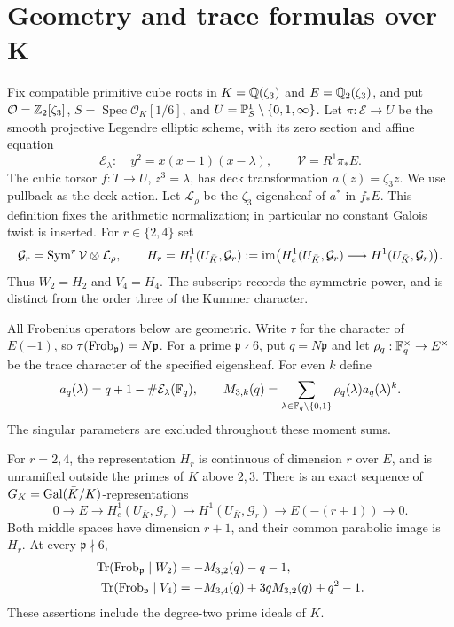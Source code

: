 \section{Geometry and trace formulas over K}\label{sec:geometry}

Fix compatible primitive cube roots in
\(K=\mathbb Q(\zeta_3)\) and \(E=\mathbb Q_2(\zeta_3)\), and put
\(\mathcal O=\mathbb Z_2[\zeta_3]\),
\(S=\operatorname{Spec}\mathcal O_K[1/6]\), and
\(U=\mathbb P^1_S\setminus\{0,1,\infty\}\).
Let \(\pi:\mathcal E\to U\) be the smooth projective Legendre elliptic
scheme, with its zero section and affine equation
\[
 \mathcal E_\lambda:\quad y^2=x(x-1)(x-\lambda),
 \qquad \mathcal V=R^1\pi_*E.
\]
The cubic torsor \(f:T\to U\), \(z^3=\lambda\), has deck
transformation \(a(z)=\zeta_3z\). We use pullback as the deck action.
Let \(\mathcal L_\rho\) be the \(\zeta_3\)-eigensheaf of \(a^*\)
in \(f_*E\). This definition fixes the arithmetic normalization;
in particular no constant Galois twist is inserted. For \(r\in\{2,4\}\)
set
\[
 \mathcal G_r=\operatorname{Sym}^r\mathcal V\otimes\mathcal L_\rho,
 \qquad
 H_r=H^1_!(U_{\bar K},\mathcal G_r)
 :=\operatorname{im}\bigl(H_c^1(U_{\bar K},\mathcal G_r)
                  \longrightarrow H^1(U_{\bar K},\mathcal G_r)\bigr).
\]
Thus \(W_2=H_2\) and \(V_4=H_4\). The subscript records the symmetric
power, and is distinct from the order three of the Kummer character.

All Frobenius operators below are geometric. Write \(\tau\) for the
character of \(E(-1)\), so \(\tau(\operatorname{Frob}_{\mathfrak p})=N\mathfrak p\).
For a prime \(\mathfrak p\nmid6\), put \(q=N\mathfrak p\) and let
\(\rho_q:\mathbb F_q^\times\to E^\times\) be the trace character of the
specified eigensheaf. For even \(k\) define
\[
 a_q(\lambda)=q+1-\#\mathcal E_\lambda(\mathbb F_q),\qquad
 M_{3,k}(q)=\sum_{\lambda\in\mathbb F_q\setminus\{0,1\}}
                  \rho_q(\lambda)a_q(\lambda)^k.
\]
The singular parameters are excluded throughout these moment sums.

\begin{theorem}\label{thm:common-geometry}
For \(r=2,4\), the representation \(H_r\) is continuous of dimension
\(r\) over \(E\), and is unramified outside the primes of \(K\) above
\(2,3\). There is an exact sequence of \(G_K=\operatorname{Gal}(\bar K/K)\)-representations
\begin{equation}\label{eq:common-full-sequence}
 0\longrightarrow E\longrightarrow H_c^1(U_{\bar K},\mathcal G_r)
 \longrightarrow H^1(U_{\bar K},\mathcal G_r)
 \longrightarrow E(-(r+1))\longrightarrow0.
\end{equation}
Both middle spaces have dimension \(r+1\), and their common parabolic
image is \(H_r\). At every \(\mathfrak p\nmid6\),
\begin{align}
 \operatorname{Tr}(\operatorname{Frob}_{\mathfrak p}\mid W_2)
   &=-M_{3,2}(q)-q-1,\label{eq:trace-W2}\\
 \operatorname{Tr}(\operatorname{Frob}_{\mathfrak p}\mid V_4)
   &=-M_{3,4}(q)+3qM_{3,2}(q)+q^2-1.
   \label{eq:trace-V4}
\end{align}
These assertions include the degree-two prime ideals of \(K\).
\end{theorem}

